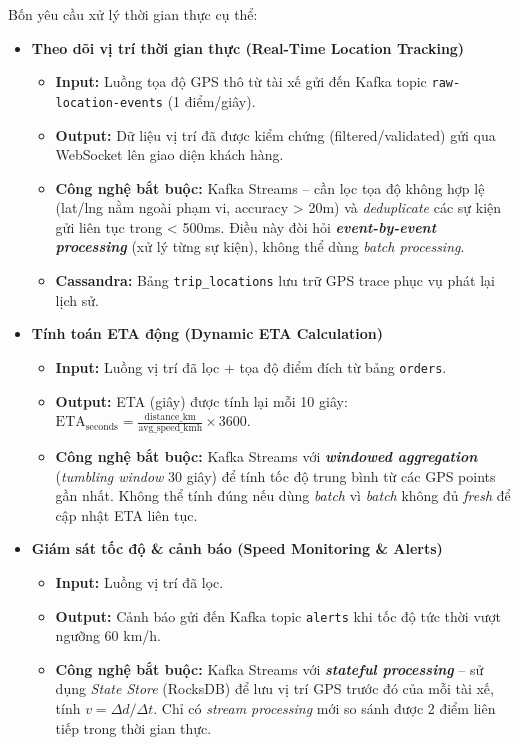 Bốn yêu cầu xử lý thời gian thực cụ thể:

\begin{itemize}

    \item \textbf{Theo dõi vị trí thời gian thực (Real-Time Location Tracking)}
    \begin{itemize}
        \item \textbf{Input:} Luồng tọa độ GPS thô từ tài xế gửi đến Kafka topic \texttt{raw-location-events} (1 điểm/giây).
        \item \textbf{Output:} Dữ liệu vị trí đã được kiểm chứng (filtered/validated) gửi qua WebSocket lên giao diện khách hàng.
        \item \textbf{Công nghệ bắt buộc:} Kafka Streams -- cần lọc tọa độ không hợp lệ (lat/lng nằm ngoài phạm vi, accuracy > 20m) và \textit{deduplicate} các sự kiện gửi liên tục trong < 500ms. Điều này đòi hỏi \textbf{\textit{event-by-event processing}} (xử lý từng sự kiện), không thể dùng \textit{batch processing}.
        \item \textbf{Cassandra:} Bảng \texttt{trip\_locations} lưu trữ GPS trace phục vụ phát lại lịch sử.
    \end{itemize}

    \item \textbf{Tính toán ETA động (Dynamic ETA Calculation)}
    \begin{itemize}
        \item \textbf{Input:} Luồng vị trí đã lọc + tọa độ điểm đích từ bảng \texttt{orders}.
        \item \textbf{Output:} ETA (giây) được tính lại mỗi 10 giây: $\text{ETA}_{\text{seconds}} = \frac{\text{distance\_km}}{\text{avg\_speed\_kmh}} \times 3600$.
        \item \textbf{Công nghệ bắt buộc:} Kafka Streams với \textbf{\textit{windowed aggregation}} (\textit{tumbling window} 30 giây) để tính tốc độ trung bình từ các GPS points gần nhất. Không thể tính đúng nếu dùng \textit{batch} vì \textit{batch} không đủ \textit{fresh} để cập nhật ETA liên tục.
    \end{itemize}

    \item \textbf{Giám sát tốc độ \& cảnh báo (Speed Monitoring \& Alerts)}
    \begin{itemize}
        \item \textbf{Input:} Luồng vị trí đã lọc.
        \item \textbf{Output:} Cảnh báo gửi đến Kafka topic \texttt{alerts} khi tốc độ tức thời vượt ngưỡng 60 km/h.
        \item \textbf{Công nghệ bắt buộc:} Kafka Streams với \textbf{\textit{stateful processing}} -- sử dụng \textit{State Store} (RocksDB) để lưu vị trí GPS trước đó của mỗi tài xế, tính $v = \Delta d / \Delta t$. Chỉ có \textit{stream processing} mới so sánh được 2 điểm liên tiếp trong thời gian thực.
    \end{itemize}


\end{itemize}
